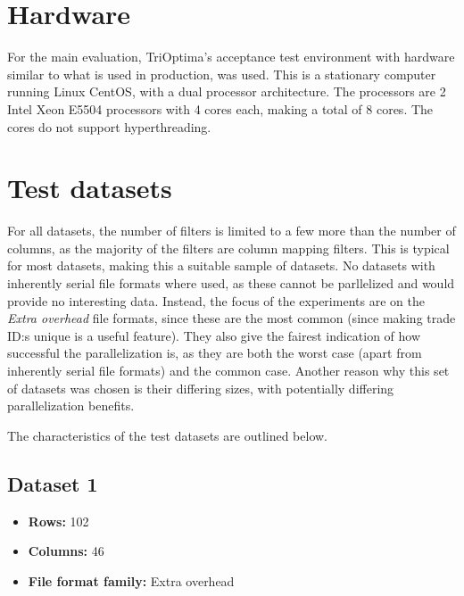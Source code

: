 \section{Hardware}
For the main evaluation, TriOptima’s acceptance test environment with hardware similar to what is used in production, was used. This is a stationary computer running Linux CentOS,
with a dual processor architecture. The processors are 2 Intel Xeon E5504 processors with 4 cores each, making a total of 8 cores. The cores do not support hyperthreading.

\section{Test datasets}
For all datasets, the number of filters is limited to a few more than the number of columns, as the majority of the filters are column mapping filters.
This is typical for most datasets, making this a suitable sample of datasets. No datasets with inherently serial file formats where used, as these cannot be
parllelized and would provide no interesting data. Instead, the focus of the experiments are on the \textit{Extra overhead} file formats, since these are the
most common (since making trade ID:s unique is a useful feature). They also give the fairest indication of how successful the parallelization is, as they are
both the worst case (apart from inherently serial file formats) and the common case. Another reason why this set of datasets was chosen is their differing sizes,
with potentially differing parallelization benefits.

The characteristics of the test datasets are outlined below.

\subsection{Dataset 1}
\begin{itemize}
  \item \textbf{Rows:} 102
  \item \textbf{Columns:} 46
  \item \textbf{File format family:} Extra overhead
\end{itemize}

